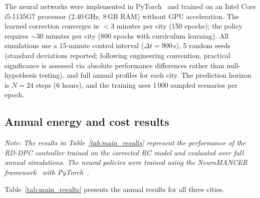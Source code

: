 \documentclass[12pt]{article}
\theoremstyle{plain}
\theoremstyle{definition}
\begin{document}
The neural networks were implemented in PyTorch~\cite{paszke2019pytorch} and trained on an Intel Core i5-1135G7 processor (2.40\,GHz, 8\,GB RAM) without GPU acceleration. The learned correction converges in $<$3 minutes per city (150 epochs); the policy requires $\sim$30 minutes per city (800 epochs with curriculum learning). All simulations use a 15-minute control interval ($\Delta t = 900$\,s), 5 random seeds (standard deviations reported; following engineering convention, practical significance is assessed via absolute performance differences rather than null-hypothesis testing), and full annual profiles for each city. The prediction horizon is $N = 24$ steps (6 hours), and the training uses 1\,000 sampled scenarios per epoch.

\subsection{Annual energy and cost results}

\textit{Note: The results in Table~\ref{tab:main_results} represent the performance of the RD-DPC controller trained on the corrected RC model and evaluated over full annual simulations. The neural policies were trained using the NeuroMANCER framework~\cite{tuor2021neuromancer} with PyTorch~\cite{paszke2019pytorch}.}

Table~\ref{tab:main_results} presents the annual results for all three cities.
\end{document}
